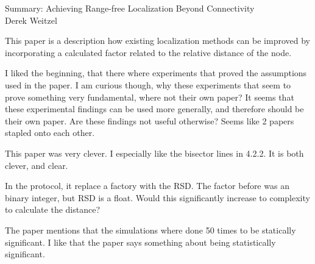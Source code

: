 \documentclass[12pt]{article}
\begin{document}
\begin{center}
{\huge Summary: Achieving Range-free Localization Beyond Connectivity} \\
Derek Weitzel
\end{center}

This paper is a description how existing localization methods can be improved by incorporating a calculated factor related to the relative distance of the node.

I liked the beginning, that there where experiments that proved the assumptions used in the paper.  I am curious though, why these experiments that seem to prove something very fundamental, where not their own paper?  It seems that these experimental findings can be used more generally, and therefore should be their own paper.  Are these findings not useful otherwise?  Seems like 2 papers stapled onto each other.

This paper was very clever.  I especially like the bisector lines in 4.2.2.  It is both clever, and clear.

In the protocol, it replace a factory with the RSD.  The factor before was an binary integer, but RSD is a float.  Would this significantly increase to complexity to calculate the distance?

The paper mentions that the simulations where done 50 times to be statically significant.  I like that the paper says something about being statistically significant.  
\end{document}
